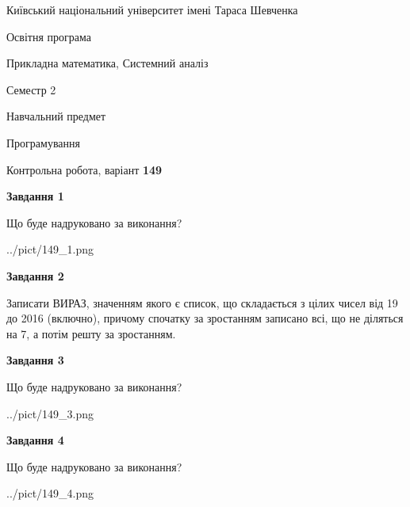 \documentclass[12pt, ukrainian]{article}
\begin{document}
{{\begin {small}\par
{ \center  Київський національний університет імені Тараса Шевченка \par}
{\parbox {5 cm}{Освітня програма \hfill}{\parbox {8 cm}{Прикладна математика, Системний аналіз \hfill}}\parbox {5 cm}{\hfill Семестр 2}}\par
{\parbox {5 cm} {Навчальний предмет \hfill}\parbox {7 cm}{Програмування \hfill}\parbox {6cm}{\hfill}\par}\vspace{-7pt} \end{small}}{\center Контрольна робота, варіант  \No \textbf
{ 149 }\par}}
{
\begin {large}
{\begin {center}\textbf{Завдання 1}\end {center}}\par
Що буде надруковано за виконання?\par\par
\begin{center}
	{../pict/149_1.png}
\end{center}
\newpage

{\begin {center}\textbf{Завдання 2}\end {center}}\par

Записати ВИРАЗ, значенням якого є список, що складається з цілих чисел від 19 до 2016 (включно), причому спочатку за зростанням записано всі, що не діляться на 7, а потім решту за зростанням.\par
\newpage

{\begin {center}\textbf{Завдання 3}\end {center}}\par
Що буде надруковано за виконання?
\begin{center}
	{../pict/149_3.png}
\end{center}
\newpage

{\begin {center}\textbf{Завдання 4}\end {center}}\par
Що буде надруковано за виконання?\par
\begin{center}
	{../pict/149_4.png}
\end{center}
\newpage


\end{large}}
\end{document}
